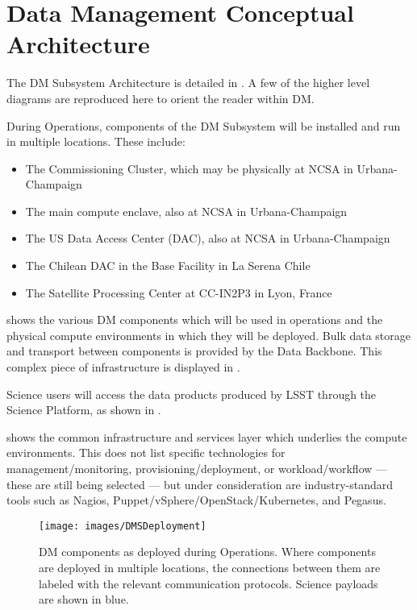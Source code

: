 \section{Data Management Conceptual Architecture \label{sect:dmarc}}

The DM Subsystem Architecture is detailed in .
A few of the higher level diagrams are reproduced here to orient the reader within DM.

During Operations, components of the DM Subsystem will be installed and run in
multiple locations. These include:

\begin{itemize}
\item The Commissioning Cluster, which may be physically at NCSA in Urbana-Champaign
\item The main compute enclave, also at NCSA in Urbana-Champaign
\item The US Data Access Center (DAC), also at NCSA in Urbana-Champaign
\item The Chilean DAC in the Base Facility in La Serena Chile
\item The Satellite Processing Center at CC-IN2P3 in Lyon, France
\end{itemize}

 shows the various DM components which will be used in operations and the physical compute environments in which they will be deployed.
Bulk data storage and transport between components is provided by the Data Backbone. This complex piece of infrastructure is displayed in .

Science users will access the data products produced by LSST through the
Science Platform, as shown in .

 shows the common infrastructure and services layer which underlies the compute environments.
This does not list specific technologies for management/monitoring, provisioning/deployment, or workload/workflow --- these are still being selected --- but under consideration are industry-standard tools such as Nagios, Puppet/vSphere/OpenStack/Kubernetes, and Pegasus.

\begin{figure}[htbp]
\begin{center}
\texttt{[image: images/DMSDeployment]}
\caption{DM components as deployed during Operations. Where components are
deployed in multiple locations, the connections between them are labeled with
the relevant communication protocols. Science payloads are shown in blue.
\label{fig:dmsdeploy}}
\end{center}
\end{figure}

